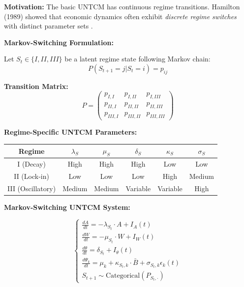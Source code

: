 \begin{tcolorbox}[colback=red!5!white, colframe=red!75!black,
    title=\textbf{Extension UNTCM-X4: Markov-Switching UNTCM}]

\textbf{Motivation:} The basic UNTCM has continuous regime transitions. Hamilton (1989) showed that economic dynamics often exhibit \emph{discrete regime switches} with distinct parameter sets \citep{hamilton1989new}.

\textbf{Markov-Switching Formulation:}

Let $S_t \in \{I, II, III\}$ be a latent regime state following Markov chain:
\begin{equation}
P(S_{t+1} = j | S_t = i) = p_{ij}
\end{equation}

\textbf{Transition Matrix:}
\begin{equation}
P = \begin{pmatrix}
p_{I,I} & p_{I,II} & p_{I,III} \\
p_{II,I} & p_{II,II} & p_{II,III} \\
p_{III,I} & p_{III,II} & p_{III,III}
\end{pmatrix}
\end{equation}

\textbf{Regime-Specific UNTCM Parameters:}

\begin{center}
\renewcommand{\arraystretch}{1.2}
\begin{tabular}{@{}cccccc@{}}
\toprule
\textbf{Regime} & $\lambda_S$ & $\mu_S$ & $\delta_S$ & $\kappa_S$ & $\sigma_S$ \\
\midrule
I (Decay) & High & High & High & Low & Low \\
II (Lock-in) & Low & Low & Low & High & Medium \\
III (Oscillatory) & Medium & Medium & Variable & Variable & High \\
\bottomrule
\end{tabular}
\end{center}

\textbf{Markov-Switching UNTCM System:}

\begin{equation}
\boxed{
\begin{cases}
\displaystyle\frac{dA}{dt} = -\lambda_{S_t} \cdot A + I_A(t) \\[0.5em]
\displaystyle\frac{dW}{dt} = -\mu_{S_t} \cdot W + I_W(t) \\[0.5em]
\displaystyle\frac{d\theta}{dt} = \delta_{S_t} + I_\theta(t) \\[0.5em]
\displaystyle\frac{d\Psi_k}{dt} = \mu_k + \kappa_{S_t,k} \cdot \bar{B} + \sigma_{S_t,k} \epsilon_k(t) \\[0.5em]
S_{t+1} \sim \text{Categorical}(P_{S_t, \cdot})
\end{cases}
}
\label{eq:ms-untcm}
\end{equation}


\end{tcolorbox}
